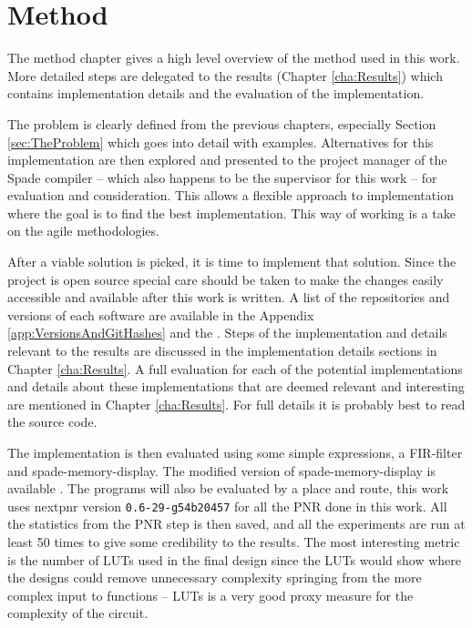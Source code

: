 \chapter{Method}
The method chapter gives a high level overview of the method used in this work. More detailed steps are delegated to the results (Chapter \ref{cha:Results}) which contains implementation details and the evaluation of the implementation.

The problem is clearly defined from the previous chapters, especially Section \ref{sec:TheProblem} which goes into detail with examples. Alternatives for this implementation are then explored and presented to the project manager of the Spade compiler -- which also happens to be the supervisor for this work -- for evaluation and consideration. This allows a flexible approach to implementation where the goal is to find the best implementation. This way of working is a take on the agile methodologies.

After a viable solution is picked, it is time to implement that solution. Since the project is open source special care should be taken to make the changes easily accessible and available after this work is written. A list of the repositories and versions of each software are available in the Appendix \ref{app:VersionsAndGitHashes} and the . Steps of the implementation and details relevant to the results are discussed in the implementation details sections in Chapter \ref{cha:Results}. A full evaluation for each of the potential implementations and details about these implementations that are deemed relevant and interesting are mentioned in Chapter \ref{cha:Results}. For full details it is probably best to read the source code. 

The implementation is then evaluated using some simple expressions, a FIR-filter  and spade-memory-display. The modified version of spade-memory-display is available . The programs will also be evaluated by a place and route, this work uses nextpnr version \verb+0.6-29-g54b20457+ for all the PNR done in this work. All the statistics from the PNR step is then saved, and all the experiments are run at least 50 times to give some credibility to the results. The most interesting metric is the number of LUTs used in the final design since the LUTs would show where the designs could remove unnecessary complexity springing from the more complex input to functions -- LUTs is a very good proxy measure for the complexity of the circuit.

